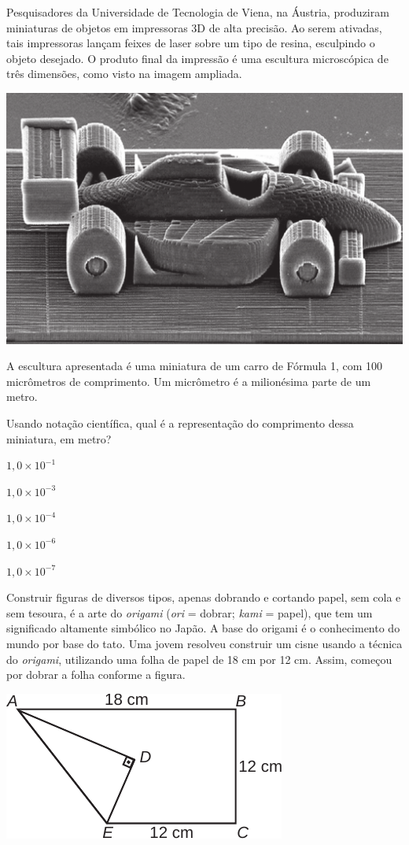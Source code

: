 \questao
Pesquisadores da Universidade de Tecnologia
de Viena, na Áustria, produziram miniaturas de
objetos em impressoras 3D de alta precisão. Ao
serem ativadas, tais impressoras lançam feixes de
laser sobre um tipo de resina, esculpindo o objeto
desejado. O produto final da impressão é uma
escultura microscópica de três dimensões, como
visto na imagem ampliada.

\begin{center}
\includegraphics[width=.48\textwidth]{subareas/matematica/enem_2020-147-foto.pdf}
\end{center}

A escultura apresentada é uma miniatura de
um carro de Fórmula 1, com 100 micrômetros de
comprimento. Um micrômetro é a milionésima parte
de um metro.

Usando notação científica, qual é a representação do
comprimento dessa miniatura, em metro?

\begin{alternativas}
\item $1,0 \times 10^{-1}$
\item $1,0 \times 10^{-3}$
\item $1,0 \times 10^{-4}$
\item $1,0 \times 10^{-6}$
\item $1,0 \times 10^{-7}$
\end{alternativas}

\questao
Construir figuras de diversos tipos, apenas
dobrando e cortando papel, sem cola e sem tesoura, é
a arte do \textit{origami} (\textit{ori} = dobrar; \textit{kami} = papel), que tem
um significado altamente simbólico no Japão. A base
do origami é o conhecimento do mundo por base do
tato. Uma jovem resolveu construir um cisne usando
a técnica do \textit{origami}, utilizando uma folha de papel de
18 cm por 12 cm. Assim, começou por dobrar a folha
conforme a figura.

\begin{center}
\includegraphics[width=.35\textwidth]{subareas/matematica/enem_2019-171-desenho.pdf}
\end{center}

